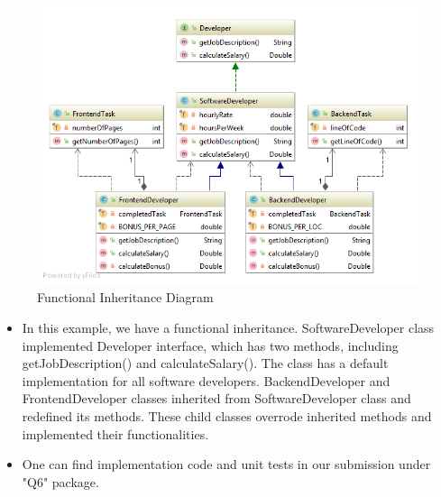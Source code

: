 \begin{figure}[H]
	\centering 
	\includegraphics[clip, trim=0cm 0cm 0cm 0cm, scale=0.8]{../uml/q6_ClassDiagram.png}
	\caption{Functional Inheritance Diagram}
\end{figure}

\begin{itemize}
\item In this example, we have a functional inheritance. SoftwareDeveloper class implemented Developer interface, which has two methods, including getJobDescription() and calculateSalary(). The class has a default implementation for all software developers. BackendDeveloper and FrontendDeveloper classes inherited from SoftwareDeveloper class and redefined its methods. These child classes overrode inherited methods and implemented their functionalities.
\item One can find implementation code and unit tests in our submission under "Q6" package.
\end{itemize}